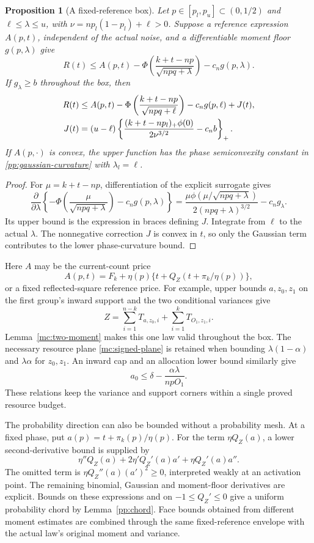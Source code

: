 \documentclass[aop,preprint]{imsart}
\newtheorem{proposition}[theorem]{Proposition}
\theoremstyle{definition}
\numberwithin{equation}{section}
\begin{document}
\begin{proposition}[A fixed-reference box]\label{ce:fixed-box}
Let $p\in[p_l,p_u]\subset(0,1/2)$ and $\ell\le\lambda\le u$, with
$\nu=np_l(1-p_l)+\ell>0$. Suppose a reference expression $A(p,t)$,
independent of the actual noise, and a differentiable moment floor
$g(p,\lambda)$ give
\[
 R(t)\le A(p,t)-\Phi\left(\frac{k+t-np}{\sqrt{npq+\lambda}}\right)
                      -c_ng(p,\lambda).
\]
If $g_\lambda\ge b$ throughout the box, then
\begin{align}\label{ce:fixed-box-bound}
 R(t)\le{}&A(p,t)-\Phi\left(\frac{k+t-np}{\sqrt{npq+\ell}}\right)
                      -c_ng(p,\ell)+J(t),\\
 J(t)={}&(u-\ell)
 \left\{\frac{(k+t-np_l)_+\phi(0)}{2\nu^{3/2}}-c_nb\right\}_+.
 \notag
\end{align}
If $A(p,\cdot)$ is convex, the upper function has the phase
semiconvexity constant in \eqref{pp:gaussian-curvature} with
$\lambda_l=\ell$.
\end{proposition}
\begin{proof}
For $\mu=k+t-np$, differentiation of the explicit surrogate gives
\[
 \frac\partial{\partial\lambda}
 \left\{-\Phi\left(\frac\mu{\sqrt{npq+\lambda}}\right)-c_ng(p,\lambda)\right\}
 =\frac{\mu\phi(\mu/\sqrt{npq+\lambda})}{2(npq+\lambda)^{3/2}}
                           -c_ng_\lambda.
\]
Its upper bound is the expression in braces defining $J$.
Integrate from $\ell$ to the actual $\lambda$. The nonnegative
correction $J$ is convex in $t$, so only the Gaussian term contributes
to the lower phase-curvature bound.
\end{proof}

Here $A$ may be the current-count price
\[
 A(p,t)=F_k+\eta(p)\{t+Q_Z(t+\pi_k/\eta(p))\},
\]
or a fixed reflected-square reference price. For example, upper bounds
$a,z_0,z_1$ on the first group's inward support and the two conditional
variances give
\[
 Z=\sum_{i=1}^{n-k}T_{a,z_0,i}+\sum_{i=1}^{k}T_{O_1,z_1,i}.
\]
Lemma~\ref{mc:two-moment} makes this one law valid throughout the box.
The necessary resource plane \eqref{mc:signed-plane} is retained when
bounding $\lambda(1-\alpha)$ and $\lambda\alpha$ for $z_0,z_1$.
An inward cap and an allocation lower bound similarly give
\[
 a_0\le\delta-\frac{\alpha\lambda}{npO_1}.
\]
These relations keep the variance and support corners within a single
proved resource budget.

The probability direction can also be bounded without a probability
mesh. At a fixed phase, put $a(p)=t+\pi_k(p)/\eta(p)$.
For the term $\eta Q_Z(a)$, a lower second-derivative bound is supplied by
\begin{equation}\label{ce:probability-curvature}
 \eta''Q_Z(a)+2\eta'Q_Z'(a)a'+\eta Q_Z'(a)a''.
\end{equation}
The omitted term is $\eta Q_Z''(a)(a')^2\ge0$, interpreted weakly
at an activation point. The remaining binomial, Gaussian and moment-floor
derivatives are explicit. Bounds on these expressions and on
$-1\le Q_Z'\le0$ give a uniform probability chord by
Lemma~\ref{pp:chord}. Face bounds obtained from different moment
estimates are combined through the same fixed-reference envelope with
the actual law's original moment and variance.
\end{document}

